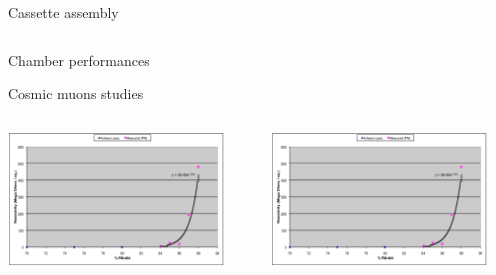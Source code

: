 \documentclass[10pt]{beamer}
\begin{document}
\begin{frame}{Cassette assembly}
\begin{columns}
\begin{column}{0.5\textwidth}
\begin{center}
\begin{tikzpicture}
          \end{tikzpicture}
        \end{center}

      \end{column}
    \end{columns}

\end{frame}
\begin{frame}{Chamber performances}
\begin{block}{Cosmic muons studies}
  \begin{columns}

      \begin{column}{0.5\textwidth}
        \centerline{\includegraphics[width=0.9\textwidth]{images/CoatingStudies}}
      \end{column}
      \begin{column}{0.5\textwidth}
        \centerline{\includegraphics[width=0.9\textwidth]{images/CoatingStudies}}
      \end{column}
    \end{columns}

\end{block}
\end{frame}
\end{document}
